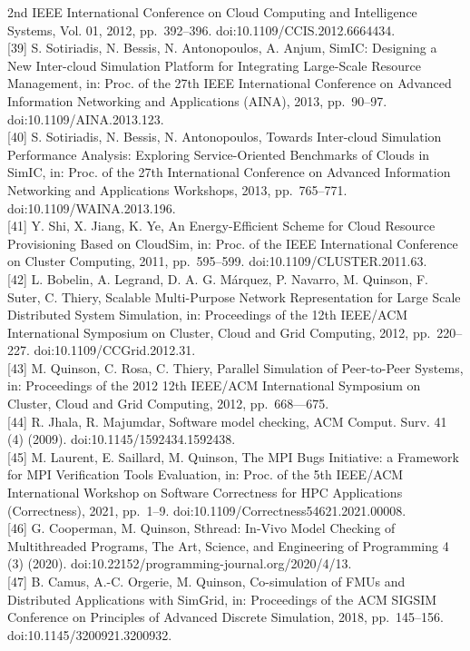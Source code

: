 \documentclass[
]{article}
\begin{document}
2nd IEEE International Conference on Cloud Computing and Intelligence
Systems, Vol. 01, 2012, pp.~392--396. doi:10.1109/CCIS.2012.6664434.\\
{[}39{]} S. Sotiriadis, N. Bessis, N. Antonopoulos, A. Anjum, SimIC:
Designing a New Inter-cloud Simulation Platform for Integrating
Large-Scale Resource Management, in: Proc. of the 27th IEEE
International Conference on Advanced Information Networking and
Applications (AINA), 2013, pp.~90--97. doi:10.1109/AINA.2013.123.\\
{[}40{]} S. Sotiriadis, N. Bessis, N. Antonopoulos, Towards Inter-cloud
Simulation Performance Analysis: Exploring Service-Oriented Benchmarks
of Clouds in SimIC, in: Proc. of the 27th International Conference on
Advanced Information Networking and Applications Workshops, 2013,
pp.~765--771. doi:10.1109/WAINA.2013.196.\\
{[}41{]} Y. Shi, X. Jiang, K. Ye, An Energy-Efficient Scheme for Cloud
Resource Provisioning Based on CloudSim, in: Proc. of the IEEE
International Conference on Cluster Computing, 2011, pp.~595--599.
doi:10.1109/CLUSTER.2011.63.\\
{[}42{]} L. Bobelin, A. Legrand, D. A. G. Márquez, P. Navarro, M.
Quinson, F. Suter, C. Thiery, Scalable Multi-Purpose Network
Representation for Large Scale Distributed System Simulation, in:
Proceedings of the 12th IEEE/ACM International Symposium on Cluster,
Cloud and Grid Computing, 2012, pp.~220--227.
doi:10.1109/CCGrid.2012.31.\\
{[}43{]} M. Quinson, C. Rosa, C. Thiery, Parallel Simulation of
Peer-to-Peer Systems, in: Proceedings of the 2012 12th IEEE/ACM
International Symposium on Cluster, Cloud and Grid Computing, 2012,
pp.~668---675.\\
{[}44{]} R. Jhala, R. Majumdar, Software model checking, ACM Comput.
Surv. 41 (4) (2009). doi:10.1145/1592434.1592438.\\
{[}45{]} M. Laurent, E. Saillard, M. Quinson, The MPI Bugs Initiative: a
Framework for MPI Verification Tools Evaluation, in: Proc. of the 5th
IEEE/ACM International Workshop on Software Correctness for HPC
Applications (Correctness), 2021, pp.~1--9.
doi:10.1109/Correctness54621.2021.00008.\\
{[}46{]} G. Cooperman, M. Quinson, Sthread: In-Vivo Model Checking of
Multithreaded Programs, The Art, Science, and Engineering of Programming
4 (3) (2020). doi:10.22152/programming-journal.org/2020/4/13.\\
{[}47{]} B. Camus, A.-C. Orgerie, M. Quinson, Co-simulation of FMUs and
Distributed Applications with SimGrid, in: Proceedings of the ACM SIGSIM
Conference on Principles of Advanced Discrete Simulation, 2018,
pp.~145--156. doi:10.1145/3200921.3200932.
\end{document}
